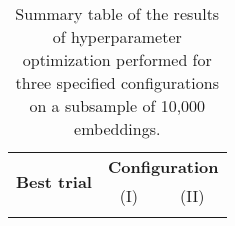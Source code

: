 \begin{table}[!htbp]
\begin{longtable}[c]{|cl|cc|}
    \caption{Summary table of the results of hyperparameter optimization performed for three specified configurations on a subsample of 10,000 embeddings.}
    \label{tab:experiment_results}\\
    \hline
    \multicolumn{2}{|c|}{\multirow{2}{*}{\textbf{Best trial}}} & \multicolumn{2}{c|}{\textbf{Configuration}}                                                \\ \cline{3-4}
    \multicolumn{2}{|c|}{}                                     & \multicolumn{1}{c|}{(I)} & \multicolumn{1}{c|}{(II)} \\ \hline
    \endfirsthead

    \endhead

    \hline
    \endfoot

    \endlastfoot


\end{longtable}
\end{table}
